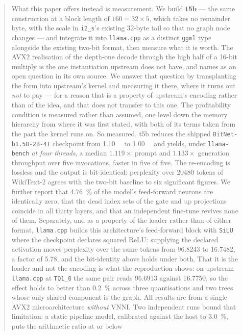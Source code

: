 \documentclass[11pt,a4paper]{article}
\newcommand{\code}[1]{\texttt{#1}}
\begin{document}
\begin{abstract}
What this paper offers instead is measurement. We build \textbf{t5b} --- the
same construction at a block length of $160=32\times5$, which takes no remainder
byte, with the scale in \code{i2\_s}'s existing 32-byte tail so that no graph
node changes --- and integrate it into \code{llama.cpp} as a distinct
\code{ggml} type alongside the existing two-bit format, then measure what it is
worth. The AVX2 realisation of the depth-one decode through the high half of a
16-bit multiply is the one instantiation upstream does not have, and names as an
open question in its own source. We answer that question by transplanting the
form into upstream's kernel and measuring it there, where it turns out
\emph{not} to pay --- for a reason that is a property of upstream's encoding
rather than of the idea, and that does not transfer to this one. The profitability condition is measured rather than
assumed, one level down the memory hierarchy from where it was first stated,
with both of its terms taken from the part the kernel runs on. So measured, t5b
reduces the shipped \code{BitNet-b1.58-2B-4T} checkpoint
from \SI{1.10}{\gibi\byte} to \SI{1.00}{\gibi\byte} and yields, under
\code{llama-bench} \emph{at four threads}, a median $1.119\times$ prompt and
$1.133\times$ generation throughput over five invocations, faster in five of five. The re-encoding is lossless and
the output is bit-identical: perplexity over \num{20480} tokens of WikiText-2
agrees with the two-bit baseline to six significant figures. We further report
that \SI{4.76}{\percent} of the model's feed-forward neurons are identically
zero, that the dead index sets of the gate and up projections coincide in all
thirty layers, and that an independent fine-tune revives none of them. Separately,
and as a property of the loader rather than of either format, \code{llama.cpp}
builds this architecture's feed-forward block with \code{SiLU} where the
checkpoint declares squared ReLU: supplying the declared activation moves
perplexity over the same tokens from \num{96.8243} to \num{16.7482}, a factor of
\num{5.78}, and the bit-identity above holds under both. That it is the loader
and not the encoding is what the reproduction shows: on upstream
\code{llama.cpp} at \code{TQ1\_0} the same pair reads \num{96.6913} against
\num{16.7750}, so the effect holds to better than \SI{0.2}{\percent} across
three quantisations and two trees whose only shared component is the graph. All
results are from a single AVX2 microarchitecture \emph{without} VNNI. Two
independent runs bound that limitation: a static pipeline model, calibrated
against the host to \SI{3.0}{\percent}, puts the arithmetic ratio at or below

\end{abstract}
\end{document}
